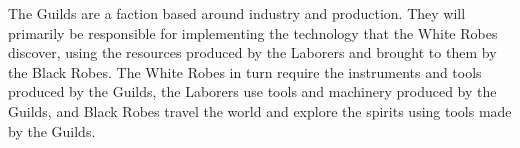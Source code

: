 The Guilds are a faction based around industry and production. They will primarily be responsible for implementing the technology that the White Robes discover, using the resources produced by the Laborers and brought to them by the Black Robes. The White Robes in turn require the instruments and tools produced by the Guilds, the Laborers use tools and machinery produced by the Guilds, and Black Robes travel the world and explore the spirits using tools made by the Guilds. 